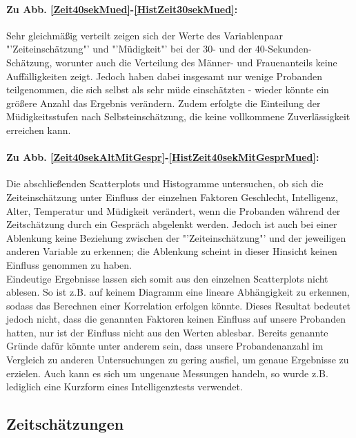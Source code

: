 \documentclass{Paper}
\begin{document}
\paragraph{Zu Abb. \ref{Zeit40sekMued}-\ref{HistZeit30sekMued}:} Sehr gleichmäßig verteilt zeigen sich der Werte des Variablenpaar "'Zeiteinschätzung"' und "'Müdigkeit"' bei der 30- und der 40-Sekunden-Schätzung, worunter auch die Verteilung des Männer- und Frauenanteils keine Auffälligkeiten zeigt. Jedoch haben dabei insgesamt nur wenige Probanden teilgenommen, die sich selbst als sehr müde einschätzten - wieder könnte ein größere Anzahl das Ergebnis verändern. Zudem erfolgte die Einteilung der Müdigkeitsstufen nach Selbsteinschätzung, die keine vollkommene Zuverlässigkeit erreichen kann. 

\paragraph{Zu Abb. \ref{Zeit40sekAltMitGespr}-\ref{HistZeit40sekMitGesprMued}:} Die abschließenden Scatterplots und Histogramme untersuchen, ob sich die Zeiteinschätzung unter Einfluss der einzelnen Faktoren Geschlecht, Intelligenz, Alter, Temperatur und Müdigkeit verändert, wenn die Probanden während der Zeitschätzung durch ein Gespräch abgelenkt werden. Jedoch ist auch bei einer Ablenkung keine Beziehung zwischen der "'Zeiteinschätzung"' und der jeweiligen anderen Variable zu erkennen; die Ablenkung scheint in dieser Hinsicht keinen Einfluss genommen zu haben.\\ 

Eindeutige Ergebnisse lassen sich somit aus den einzelnen Scatterplots nicht ablesen. So ist z.B. auf keinem Diagramm eine lineare Abhängigkeit zu erkennen, sodass das Berechnen einer Korrelation erfolgen könnte. Dieses Resultat bedeutet jedoch nicht, dass die genannten Faktoren keinen Einfluss auf unsere Probanden hatten, nur ist der Einfluss nicht aus den Werten ablesbar. Bereits genannte Gründe dafür könnte unter anderem sein, dass unsere Probandenanzahl im Vergleich zu anderen Untersuchungen zu gering ausfiel, um genaue Ergebnisse zu erzielen. Auch kann es sich um ungenaue Messungen handeln, so wurde z.B. lediglich eine Kurzform eines Intelligenztests verwendet.

\subsection{Zeitschätzungen}
\end{document}
